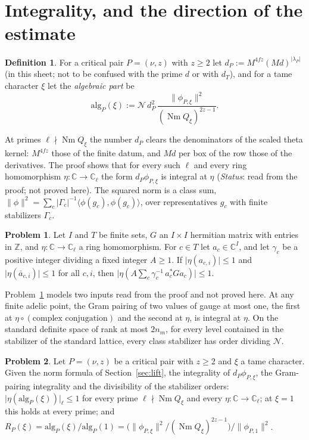 \documentclass[reqno]{amsart}
\theoremstyle{definition}
\newtheorem{problem}{Problem}[section]
\newtheorem{definition}{Definition}[section]
\theoremstyle{plain}
\theoremstyle{remark}
\newcommand{\Z}{\mathbb{Z}}
\newcommand{\C}{\mathbb{C}}
\newcommand{\Nc}{\mathcal{N}}
\newcommand{\Nm}{\operatorname{Nm}}
\newcommand{\alg}{\mathrm{alg}}
\begin{document}
\section{Integrality, and the direction of the estimate}\label{sec:alg}

\begin{definition}\label{def:alg}
For a critical pair \(P = (\nu, z)\) with \(z \ge 2\) let \(d_P := M^{4fz}(Md)^{\lvert\lambda_P\rvert}\) (in this sheet; not to be confused with the prime \(d\) or with \(d_T\)), and for a tame character \(\xi\) let the \emph{algebraic part} be
\[
  \alg_P(\xi) := \Nc\, d_P^2\, \frac{\lVert\phi_{P,\xi}\rVert^2}{(\Nm Q_\xi)^{2z-1}} .
\]
\end{definition}

At primes \(\ell \nmid \Nm Q_\xi\) the number \(d_P\) clears the denominators of the scaled theta kernel: \(M^{4fz}\) those of the finite datum, and \(Md\) per box of the row those of the derivatives.  The proof shows that for every such \(\ell\) and every ring homomorphism \(\eta\colon\C\to\C_\ell\) the form \(d_P\phi_{P,\xi}\) is integral at \(\eta\) (\emph{Status}: read from the proof; not proved here).  The squared norm is a class sum, \(\lVert\phi\rVert^2 = \sum_c \lvert\Gamma_c\rvert^{-1}\langle\phi(g_c),\phi(g_c)\rangle\), over representatives \(g_c\) with finite stabilizers \(\Gamma_c\).

\begin{problem}\label{pr:class-sum}
Let \(I\) and \(T\) be finite sets, \(G\) an \(I\times I\) hermitian matrix with entries in \(\Z\), and \(\eta\colon\C\to\C_\ell\) a ring homomorphism.  For \(c \in T\) let \(a_c \in \C^I\), and let \(\gamma_c\) be a positive integer dividing a fixed integer \(A \ge 1\).  If \(\lvert\eta(a_{c,i})\rvert \le 1\) and \(\lvert\eta(\bar a_{c,i})\rvert \le 1\) for all \(c, i\), then \(\lvert\eta(A\sum_c \gamma_c^{-1}\, a_c^* G a_c)\rvert \le 1\).
\end{problem}

Problem~\ref{pr:class-sum} models two inputs read from the proof and not proved here.  At any finite adelic point, the Gram pairing of two values of gauge at most one, the first at \(\eta\circ(\text{complex conjugation})\) and the second at \(\eta\), is integral at \(\eta\).  On the standard definite space of rank at most \(2n_m\), for every level contained in the stabilizer of the standard lattice, every class stabilizer has order dividing \(\Nc\).

\begin{problem}\label{pr:alg}
Let \(P = (\nu, z)\) be a critical pair with \(z \ge 2\) and \(\xi\) a tame character.  Given the norm formula of Section~\ref{sec:lift}, the integrality of \(d_P\phi_{P,\xi}\), the Gram-pairing integrality and the divisibility of the stabilizer orders: \(\lvert\eta(\alg_P(\xi))\rvert_\ell \le 1\) for every prime \(\ell \nmid \Nm Q_\xi\) and every \(\eta\colon\C\to\C_\ell\); at \(\xi = 1\) this holds at every prime; and \(R_P(\xi) = \alg_P(\xi)/\alg_P(1) = \bigl(\lVert\phi_{P,\xi}\rVert^2/(\Nm Q_\xi)^{2z-1}\bigr)/\lVert\phi_{P,1}\rVert^2\).
\end{problem}
\end{document}
